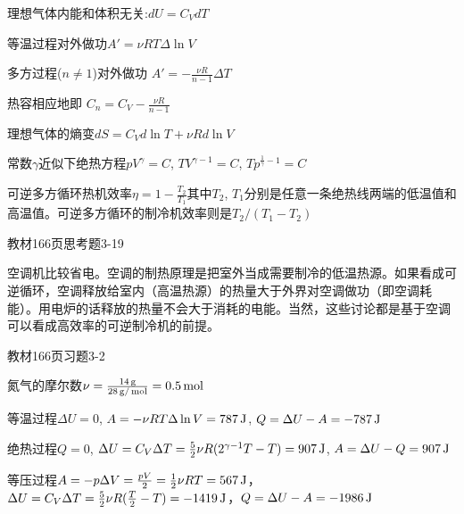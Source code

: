 \documentclass[CJK]{beamer}
\begin{document}
\begin{frame}
  \bch
  \bitem
  \item{理想气体内能和体积无关:$dU = C_V dT$}
  \item{等温过程对外做功$A'=\nu RT \Delta \ln V$}
  \item{
  多方过程($n\ne 1$)对外做功
  $A' = -\frac{\nu R}{n-1}\Delta T$
  
  热容相应地即
  $C_n = C_V - \frac{\nu R}{n-1}$}
  \item{理想气体的熵变$ dS = C_V d \ln T + \nu R d\ln V$}
  \item{常数$\gamma$近似下绝热方程$pV^\gamma = C$, $TV^{\gamma-1} =C$, $Tp^{\frac{1}{\gamma}-1} = C$}
  \item{可逆多方循环热机效率$\eta = 1- \frac{T_2}{T_1}$其中$T_2$, $T_1$分别是任意一条绝热线两端的低温值和高温值。可逆多方循环的制冷机效率则是$T_2/(T_1-T_2)$}
  \eitem
  \ech  
\end{frame}

\begin{frame}
  \bch
  教材166页思考题3-19
  \ech
\end{frame}


\begin{frame}
  \bch
  空调机比较省电。空调的制热原理是把室外当成需要制冷的低温热源。如果看成可逆循环，空调释放给室内（高温热源）的热量大于外界对空调做功（即空调耗能）。用电炉的话释放的热量不会大于消耗的电能。当然，这些讨论都是基于空调可以看成高效率的可逆制冷机的前提。
  \ech
\end{frame}

\begin{frame}
  \bch
  教材166页习题3-2
  
  \ech
\end{frame}


\begin{frame}
  \bch
  {\small
  氮气的摩尔数$\nu = \frac{14\,\mathrm{g}}{28\,\mathrm{g}/\,\mathrm{mol}} = 0.5\,\mathrm{mol}$
  \bitem
\item{等温过程$\Delta U = 0$, $A = -\nu R T\Delta \ln V = 787\,\mathrm{J}$, $Q = \Delta U - A = - 787\,\mathrm{J}$
}
\item{绝热过程$Q=0$, $\Delta U = C_V \Delta T = \frac{5}{2}\nu R (2^{\gamma-1}T -T) = 907\,\mathrm{J}$, $A = \Delta U - Q = 907\,\mathrm{J}$}
\item{等压过程$A = -p\Delta V = \frac{pV}{2} = \frac{1}{2}\nu R T = 567\,\mathrm{J}$，$\Delta U = C_V \Delta T = \frac{5}{2}\nu R (\frac{T}{2}-T) = -1419\,\mathrm{J}$，$Q = \Delta U - A = -1986 \,\mathrm{J}$}
  \eitem
  }
  \ech
\end{frame}
\end{document}
